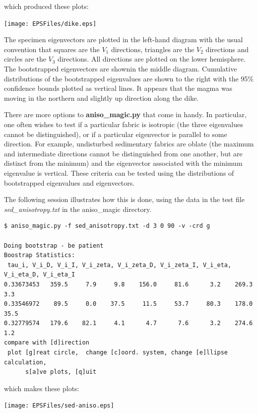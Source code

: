 \documentclass[11pt]{book}
\begin{document}
{{\begin{verbatim}
\end{verbatim}

{\noindent which produced these plots:}


  \texttt{[image: EPSFiles/dike.eps]}

The specimen eigenvectors are plotted in the left-hand diagram with the usual convention that squares are the $V_1$ directions, triangles are the $V_2$ directions and circles are the $V_3$ directions.  All directions are plotted on the lower hemisphere.     The bootstrapped eigenvectors are shownin the middle diagram.   Cumulative distributions of the bootstrapped eigenvalues are shown to the right with the 95\% confidence bounds plotted as vertical lines.
It appears that the magma was moving in the northern and slightly up direction along the dike.

There are more options to {\bf aniso\_magic.py} that come in handy.   In particular, one often wishes to test if a particular fabric is isotropic (the three eigenvalues cannot be distinguished), or if a particular eigenvector is parallel to some direction. For example, undisturbed sedimentary fabrics are oblate (the maximum and intermediate directions cannot be distinguished from one another, but are distinct from the minimum) and the eigenvector associated with the minimum eigenvalue is vertical. These criteria can be tested using the distributions of bootstrapped eigenvalues and eigenvectors.

The following session illustrates how this is done, using the data in the test file {\it sed\_anisotropy.txt} in the aniso\_magic directory.

\begin{verbatim}
$ aniso_magic.py -f sed_anisotropy.txt -d 3 0 90 -v -crd g

Doing bootstrap - be patient
Boostrap Statistics:
 tau_i, V_i_D, V_i_I, V_i_zeta, V_i_zeta_D, V_i_zeta_I, V_i_eta, V_i_eta_D, V_i_eta_I
0.33673453   359.5     7.9     9.8    156.0     81.6      3.2    269.3      3.3
0.33546972    89.5     0.0    37.5     11.5     53.7     80.3    178.0     35.5
0.32779574   179.6    82.1     4.1      4.7      7.6      3.2    274.6      1.2
compare with [d]irection
 plot [g]reat circle,  change [c]oord. system, change [e]llipse calculation,
      s[a]ve plots, [q]uit
 \end{verbatim}

 which makes these plots:

   \texttt{[image: EPSFiles/sed-aniso.eps]}

}}
\end{document}
